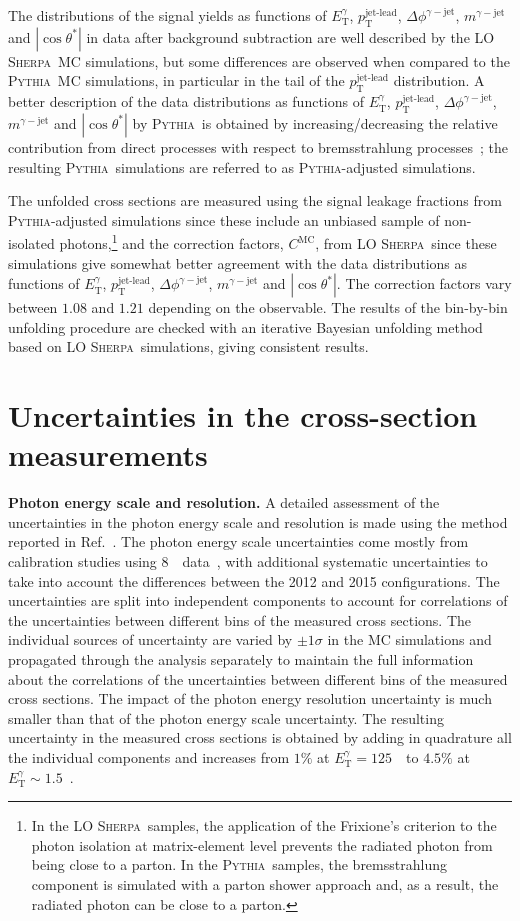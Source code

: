 \documentclass[cernpreprint,texlive=2016,txfonts,UKenglish]{latex/atlasdoc}
\def\ptjetl{p_{\mathrm{T}}^{\text{jet-lead}}}
\def\etg{E_{\mathrm{T}}^{\gamma}}
\def\mgj{m^{\gamma-{\mathrm{jet}}}}
\def\ctgj{\cos\theta^*}
\def\deltaphigj{\Delta\phi^{\gamma-{\mathrm{jet}}}}
\def\sher{{\textsc{Sherpa}}}
\def\pyt{{\textsc{Pythia}}}
\begin{document}
The distributions of the signal yields as functions of $\etg$,
$\ptjetl$, $\deltaphigj$, $\mgj$ and $|\ctgj|$ in data after
background subtraction are well described by the LO \sher\ MC
simulations, but some differences are observed when compared to the
\pyt\ MC simulations, in particular in the tail of the $\ptjetl$
distribution. A better description of the data distributions as
functions of $\etg$, $\ptjetl$, $\deltaphigj$, $\mgj$ and $|\ctgj|$ by
\pyt\ is obtained by increasing/decreasing the relative contribution
from direct processes with respect to bremsstrahlung
processes~\cite{np:b875:483,np:b918:257}; the resulting \pyt\
simulations are referred to as \pyt-adjusted simulations.

The unfolded cross sections are measured using the signal leakage
fractions from \pyt-adjusted simulations since these include an
unbiased sample of non-isolated photons,\footnote{In the LO \sher\
  samples, the application of the Frixione's criterion to the photon
  isolation at matrix-element level prevents the radiated photon from
  being close to a parton. In the \pyt\ samples, the bremsstrahlung
  component is simulated with a parton shower approach and, as a
  result, the radiated photon can be close to a parton.} and the
correction factors, $C^{\mathrm{MC}}$, from LO \sher\ since these
simulations give somewhat better agreement with the data distributions
as functions of $\etg$, $\ptjetl$, $\deltaphigj$, $\mgj$ and
$|\ctgj|$. The correction factors vary between $1.08$ and $1.21$
depending on the observable. The results of the bin-by-bin unfolding
procedure are checked with an iterative Bayesian unfolding
method~\cite{nim:a362:487} based on LO \sher\ simulations, giving
consistent results.

\section{Uncertainties in the cross-section measurements}
\label{syst}
{\textbf{Photon energy scale and resolution.}}
A detailed assessment of the uncertainties in the photon energy scale
and resolution is made using the method reported in
Ref.~\cite{pl:b770:473}. The photon energy scale uncertainties come
mostly from calibration studies using 8~\TeV\
data~\cite{epj:c74:3071}, with additional systematic uncertainties to
take into account the differences between the 2012 and 2015
configurations. The uncertainties are split into independent
components to account for correlations of the uncertainties between
different bins of the measured cross sections. The individual sources
of uncertainty are varied  by $\pm 1\sigma$ in the MC simulations and
propagated through the analysis separately to maintain the full
information about the correlations of the uncertainties between
different bins of the measured cross sections. The impact of the
photon energy resolution uncertainty is much smaller than that of the
photon energy scale uncertainty. The resulting uncertainty in the
measured cross sections is obtained by adding in quadrature all the
individual components and increases from $1\%$ at $\etg=125$~\GeV\ to
$4.5\%$ at $\etg\sim 1.5$~\TeV.
\end{document}
